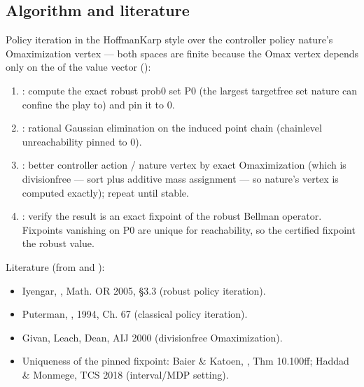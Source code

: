 \documentclass[a4paper,10pt,english]{sphinxmanual}
\begin{document}
\subsection{Algorithm and literature}
\label{\detokenize{manual/exact:algorithm-and-literature}}
\sphinxAtStartPar
Policy iteration in the Hoffman\sphinxhyphen{}Karp style over the controller policy  nature’s
O\sphinxhyphen{}maximization vertex — both spaces are finite because the O\sphinxhyphen{}max vertex depends only on
the  of the value vector ():
\begin{enumerate}
%
\item {} 
\sphinxAtStartPar
{}: compute the exact robust prob\sphinxhyphen{}0 set P0 (the largest
target\sphinxhyphen{}free set nature can confine the play to) and pin it to 0.

\item {} 
\sphinxAtStartPar
{}: rational Gaussian elimination on the induced point
chain (chain\sphinxhyphen{}level unreachability pinned to 0).

\item {} 
\sphinxAtStartPar
{}: better controller action / nature vertex by exact O\sphinxhyphen{}maximization
(which is division\sphinxhyphen{}free — sort plus additive mass assignment — so nature’s vertex
is computed exactly); repeat until stable.

\item {} 
\sphinxAtStartPar
{}: verify the result is an exact fixpoint of the robust Bellman
operator. Fixpoints vanishing on P0 are unique for reachability, so the certified
fixpoint  the robust value.

\end{enumerate}

\sphinxAtStartPar
Literature (from  and ):
\begin{itemize}
\item {} 
\sphinxAtStartPar
Iyengar, , Math. OR 2005, \S{}3.3 (robust policy
iteration).

\item {} 
\sphinxAtStartPar
Puterman, , 1994, Ch. 6\sphinxhyphen{}7 (classical policy iteration).

\item {} 
\sphinxAtStartPar
Givan, Leach, Dean, AIJ 2000 (division\sphinxhyphen{}free O\sphinxhyphen{}maximization).

\item {} 
\sphinxAtStartPar
Uniqueness of the pinned fixpoint: Baier \& Katoen, ,
Thm 10.100ff; Haddad \& Monmege, TCS 2018 (interval/MDP setting).

\end{itemize}
\end{document}
